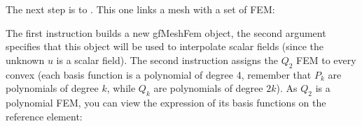 \documentclass[a4paper,11pt,english]{sphinxmanual}
\begin{document}
\sphinxAtStartPar
The next step is to . This one links a mesh with a set
of FEM:

\begin{sphinxVerbatim}[commandchars=\\\{\}]
\end{sphinxVerbatim}

\sphinxAtStartPar
The first instruction builds a new gfMeshFem object, the second argument specifies
that this object will be used to interpolate scalar fields (since the unknown
\(u\) is a scalar field). The second instruction assigns the \(Q_2\) FEM
to every convex (each basis function is a polynomial of degree 4, remember that
\(P_k\) are polynomials of degree \(k\), while
\(Q_k\) are polynomials of degree \(2k\)). As \(Q_2\) is a
polynomial FEM, you can view the expression of its basis functions on the
reference element:
\end{document}
